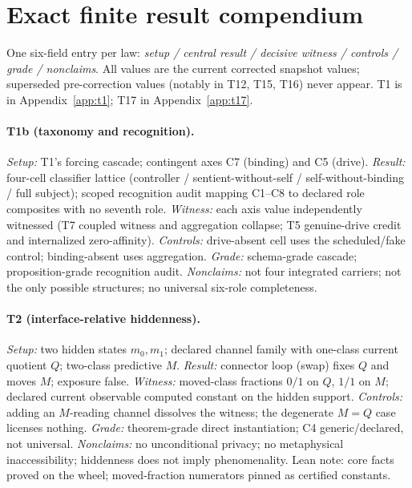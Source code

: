 \documentclass[11pt]{article}
\theoremstyle{definition}
\begin{document}
 \section{Exact finite result compendium}
\label{app:compendium}


One six-field entry per law: \emph{setup / central result / decisive witness
/ controls / grade / nonclaims}. All values are the current corrected
snapshot values; superseded pre-correction values (notably in T12, T15, T16)
never appear. T1 is in Appendix~\ref{app:t1}; T17 in Appendix~\ref{app:t17}.

\paragraph{T1b (taxonomy and recognition).}
\emph{Setup:} T1's forcing cascade; contingent axes C7 (binding) and C5
(drive). \emph{Result:} four-cell classifier lattice (controller /
sentient-without-self / self-without-binding / full subject); scoped
recognition audit mapping C1--C8 to declared role composites with no seventh
role. \emph{Witness:} each axis value independently witnessed (T7 coupled
witness and aggregation collapse; T5 genuine-drive credit and internalized
zero-affinity). \emph{Controls:} drive-absent cell uses the scheduled/fake
control; binding-absent uses aggregation. \emph{Grade:} schema-grade cascade;
proposition-grade recognition audit. \emph{Nonclaims:} not four integrated
carriers; not the only possible structures; no universal six-role
completeness.

\paragraph{T2 (interface-relative hiddenness).}
\emph{Setup:} two hidden states $m_0, m_1$; declared channel family with
one-class current quotient $Q$; two-class predictive $M$. \emph{Result:}
connector loop (swap) fixes $Q$ and moves $M$; exposure false.
\emph{Witness:} moved-class fractions $0/1$ on $Q$, $1/1$ on $M$; declared
current observable computed constant on the hidden support. \emph{Controls:}
adding an $M$-reading channel dissolves the witness; the degenerate $M = Q$
case licenses nothing. \emph{Grade:} theorem-grade direct instantiation; C4
generic/declared, not universal. \emph{Nonclaims:} no unconditional privacy;
no metaphysical inaccessibility; hiddenness does not imply phenomenality.
Lean note: core facts proved on the wheel; moved-fraction numerators pinned
as certified constants.
\end{document}

